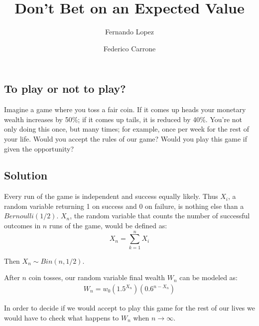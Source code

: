 \documentclass[12pt]{article}
\title{Don't Bet on an Expected Value}
\author{Fernando Lopez \and Federico Carrone}
\begin{document}
\maketitle
{}

\subsection{To play or not to play?}

Imagine a game where you toss a fair coin. If it comes up heads your monetary wealth increases by 50\%; if it comes up tails, it is reduced by 40\%. You’re not only doing this once, but many times; for example, once per week for the rest of your life. Would you accept the rules of our game? Would you play this game if given the opportunity?

\subsection{Solution}
Every run of the game is independent and success equally likely. Thus $X_i$, a random variable returning 1 on success and 0 on failure, is nothing else than a $Bernoulli(1/2)$. $X_n$, the random variable that counts the number of successful outcomes in $n$ runs of the game, would be defined as:
\begin{equation*}
 X_n = \sum\limits_{k=1}^{n} X_i
\end{equation*}

Then $X_n \sim Bin(n, 1/2)$.

After $n$ coin tosses, our random variable final wealth $W_n$ can be modeled as:
\begin{align}
  \begin{equation*}
    W_n = w_0 \left(1.5^{X_n}\right)\left(0.6^{n-X_n}\right)
  \end{equation*}
\end{align}

In order to decide if we would accept to play this game for the rest of our lives we would have to check what happens to $W_n$ when $n \rightarrow \infty$.
\\\\
\end{document}

